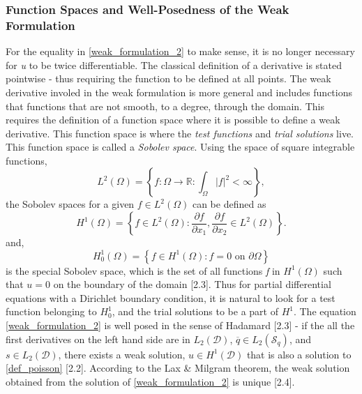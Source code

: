 \documentclass[../main.tex]{subfiles}
\begin{document}
\subsubsection{Function Spaces and Well-Posedness of the Weak Formulation}
For the equality in \eqref{weak_formulation_2} to make sense, it is no longer necessary for \emph{u} to be twice differentiable. The classical definition of a derivative
 is stated pointwise - thus requiring the function to be defined at all points. The weak derivative involed in the weak formulation is more general and includes functions that
 functions that are not smooth, to a degree, through the domain. This requires the definition of a function space where it is possible to define a weak derivative.
 This function space is where the \emph{test functions} and \emph{trial solutions} live. This function space is called a \emph{Sobolev space}. 
 Using the space of square integrable functions,
 \begin{equation} \label{square_integrable_space}
    L^{2}(\Omega) = \left\{f: \Omega \to \mathbb{R} : \int_{\Omega} |f|^{2} < \infty \right\},
 \end{equation} 
 the Sobolev spaces for a given $f \in L^{2}(\Omega)$ can be defined as
\begin{equation}\label{sobolev_space}
    H^{1}(\Omega) = \left\{f \in L^{2}(\Omega): \frac{\partial f}{\partial x_{1}}, \frac{\partial f}{\partial x_{2}} \in L^{2}(\Omega)\right\}.
\end{equation}
and,
\begin{equation} \label{hilbert_space}
    H^{1}_{0}(\Omega) = \left\{f \in H^{1}(\Omega): f = 0 \text{ on } \partial \Omega\right\}
\end{equation}
is the special Sobolev space, which is the set of all functions \emph{f} in $H^{1}(\Omega)$ such that $u = 0$ on the boundary of the domain [2.3].
 Thus for partial differential equations with a Dirichlet boundary condition, it is natural to look for a test function belonging to $H^{1}_{0}$, 
 and the trial solutions to be a part of $H^{1}$.
The equation \eqref{weak_formulation_2} is well posed in the sense of Hadamard [2.3] - if the all the first derivatives on the left hand side are in $L_{2}(\mathcal{D})$,
 $\overline{q} \in L_{2}(\mathcal{S}_{q})$, and $s \in L_{2}(\mathcal{D})$, there exists a weak solution, $u \in H^{1}(\mathcal{D})$ that is also a solution to \eqref{def_poisson} [2.2]. 
 According to the Lax \& Milgram theorem, the weak solution obtained from the solution of \eqref{weak_formulation_2} is unique [2.4]. 
\end{document}
